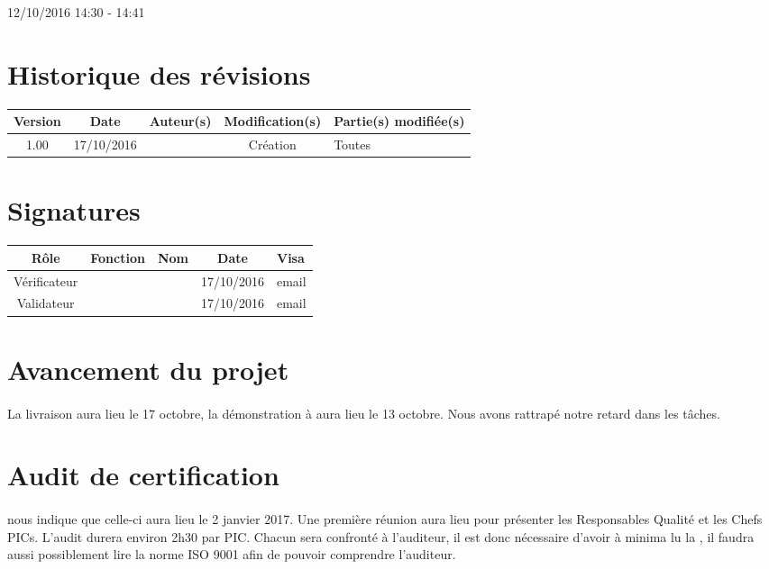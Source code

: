 \documentclass [a4paper] {article}
\begin{document}
\rhead{}

12/10/2016
\hfill   
\hfill 	14:30 - 14:41 				%



\section*{Historique des révisions}
\begin{center}
			\begin{tabular}{| c | c | c | c | p{4cm} |}
				\hline
				\rowcolor{Gray}
				Version & Date & Auteur(s) & Modification(s) & Partie(s) modifiée(s)		 \\
				\hline
				1.00 & 17/10/2016 & \Kafui & Création & Toutes \\
		\hline		
			\end{tabular}
		\end{center}

\section*{Signatures}

		\begin{center}
			\begin{tabular}{| c | c | c | c | p{4cm} |}
				\hline
				\rowcolor{Gray}
				Rôle & Fonction & Nom & Date & Visa		 \\
				\hline
				Vérificateur & \RGC & \Melissa & 17/10/2016 & email \\[30pt]
				\hline
				Validateur & \CP & \Pierre & 17/10/2016 & email \\[30pt]	
				\hline
			\end{tabular}
		\end{center}


\section{Avancement du projet}
\paragraph*{}
La livraison aura lieu le 17 octobre, la démonstration à \nomTuteurPedago{} aura lieu le 13 octobre. Nous avons rattrapé notre retard dans les tâches. 

\section{Audit de certification}
\paragraph*{}
\nomTuteurQualite{} nous indique que celle-ci aura lieu le 2 janvier 2017. Une première réunion aura lieu pour présenter les Responsables Qualité et les Chefs PICs. L'audit durera environ 2h30 par PIC.
Chacun sera confronté à l'auditeur, il est donc nécessaire d'avoir à minima lu la , il faudra aussi possiblement lire la norme ISO 9001 afin de pouvoir comprendre l'auditeur.
\end{document}
